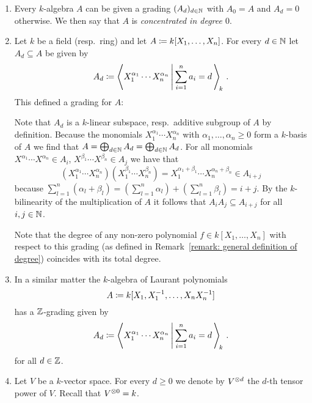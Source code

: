 \begin{example}
  \leavevmode
  \begin{enumerate}
    \item
      Every $k$-algebra $A$ can be given a grading $(A_d)_{d \in \mathbb{N}}$ with $A_0 = A$ and $A_d = 0$ otherwise.
      We then say that $A$ is \emph{concentrated in degree $0$}.
    \item
      Let $k$ be a field (resp.\ ring) and let $A \coloneqq k[X_1, \dotsc, X_n]$.
      For every $d \in \mathbb{N}$ let $A_d \subseteq A$ be given by
      \[
                  A_d 
        \defined  \gen
                  {
                    X_1^{\alpha_1} \dotsm X_n^{\alpha_n}
                  \suchthat*
                    \sum_{i=1}^n a_i = d \,
                  }_{\!k} \,.
      \]
      This defined a grading for $A$:
      
      Note that $A_d$ is a $k$-linear subspace, resp.\ additive subgroup of $A$ by definition.
      Because the monomials $X_1^{\alpha_1} \dotsm X_n^{\alpha_n}$ with $\alpha_1, \dotsc, \alpha_n \geq 0$ form a $k$-basis of $A$ we find that $A = \bigoplus_{d \in \mathbb{N}} A_d = \bigoplus_{d \in \mathbb{N}} A_d$.
      For all monomials $X^{\alpha_1} \dotsm X^{\alpha_n} \in A_i$, $X^{\beta_1} \dotsm X^{\beta_n} \in A_j$ we have that
      \[
            ( X_1^{\alpha_1} \dotsm X_n^{\alpha_n} )
            ( X_1^{\beta_1} \dotsm X_n^{\beta_n} )
        =   X_1^{\alpha_1+\beta_1} \dotsm X_n^{\alpha_n+\beta_n}
        \in A_{i+j} 
      \]
      because $\sum_{l=1}^n (\alpha_l + \beta_l) = (\sum_{l=1}^n \alpha_l) + (\sum_{l=1}^n \beta_l) = i + j$.
      By the $k$-bilinearity of the multiplication of $A$ it follows that $A_i A_j \subseteq A_{i+j}$ for all $i,j \in \mathbb{N}$.
      
      Note that the degree of any non-zero polynomial $f \in k[X_1, \dotsc, X_n]$ with respect to this grading (as defined in Remark~\ref{remark: general definition of degree}) coincides with its total degree.
    \item
      In a similar matter the $k$-algebra of Laurant polynomials
      \[
                  A
        \coloneqq  k[X_1, X_1^{-1}, \dotsc, X_n X_n^{-1}]
      \]
      has a $\mathbb{Z}$-grading given by
      \[
                  A_d 
        \defined  \gen
                  {
                    X_1^{\alpha_1} \dotsm X_n^{\alpha_n}
                  \suchthat*
                    \sum_{i=1}^n a_i = d \,
                  }_{\!k} \,.
      \]
      for all $d \in \mathbb{Z}$.
    \item
      Let $V$ be a $k$-vector space.
      For every $d \geq 0$ we denote by $V^{\mathbin{\otimes} d}$ the $d$-th tensor power of $V$.
      Recall that $V^{\mathbin{\otimes} 0} = k$.
      

\end{enumerate}
\end{example}
